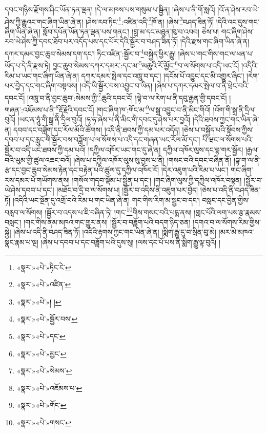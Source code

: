 དབང་གཉིས་རྫོགས་ཤིང་ཡོན་ཏན་ལྡན། །དེ་ལ་མཁས་པས་གསུམ་པ་སྦྱིན། །ཞེས་པ་ནི་གོ་སླའོ། །འོ་ན་ཤེས་རབ་ཡེ་ཤེས་ཀྱི་རྒྱུའང་གང་ཞིག་ཡིན་ཞེ་ན། །ཤེས་རབ་ཏིང་\footnote{«སྣར་»«པེ་»ཏིང་ངེ་}:འཛིན་འདི་\footnote{«སྣར་»«པེ་»འཛིན་}ཁོ་ན། །ཞེས་\footnote{«སྣར་»«པེ་»། །}བཤད་ཟིན་ཏོ། །དེའི་འང་དུས་གང་ཞིག་ཡིན་ཞེ་ན། སློབ་དཔོན་ཡོན་ཏན་ལྡན་པས་གནང་། །བླ་མ་དང་མཐུན་ཁུ་བ་འབབ། ཅེས་པ། གང་ཞིག་ཤེས་རབ་ཡེ་ཤེས་ཀྱི་དབང་ཐོབ་པར་འདོད་པས་དང་པོར་དེའི་སྦྱོར་བ་བཤད་ཟིན་ཏོ། །དེའི་རྫས་གང་ཞིག་ཡིན་ཞེ་ན། དཀར་དམར་བྱང་ཆུབ་སེམས་དག་དང་། ཏིང་འཛིན་:སྦྱོར་བ་\footnote{«སྣར་»«པེ་»སྦྱོར་བས་}བསྐྱེད་ཕྱིར་རྒྱུ། །ཞེས་པ་གང་གིས་གང་ལ་ཕན་པ་ཡོད་པ་དེ་ནི་རྫས་ཏེ། བྱང་ཆུབ་སེམས་དཀར་དམར་:དང་མ་\footnote{«སྣར་»«པེ་»དང་}མཆུའི་རོ་མྱོང་\footnote{«སྣར་»«པེ་»མྱང་}བ་ལ་སོགས་པ་འདི་ཡང་ངོ། །འདིའི་རིམ་པ་ཡང་གང་ཞིག་ཡིན་ཞེ་ན། དཀར་དམར་སྤེལ་དང་འཁྲུ་བ་དང་། །དངོས་པོ་འབྱུང་དང་མི་འགྱུར་ཞིང་། །རེག་པར་བྱེད་དང་གང་ཞིག་བསྟབས། །འདི་ཡི་སྦྱོར་བས་འབྱུང་བ་ཡིན། །ཞེས་པ་དཀར་དམར་སྤེལ་བ་ནི་ཕྲེང་བའི་དབང་ངོ། །འཁྲུ་བ་ནི་བྱང་ཆུབ་:སེམས་ཀྱི་\footnote{«སྣར་»«པེ་»སེམས་}ཆུའི་དབང་ངོ། །ལྟེ་བ་ལ་རེག་པ་ནི་དབུ་རྒྱན་གྱི་དབང་ངོ། །གཞན་:འཇོམས་པ་ནི་\footnote{«སྣར་»«པེ་»འཇོམས་པ་}རྡོ་རྗེའི་དབང་ངོ། །གང་ཞིག་ཁ་:གོང་མ་\footnote{«སྣར་»«པེ་»གོང་}ལ་སྒྲ་འབྱུང་བ་ནི་མིང་གིའོ། །འོག་གི་སྒྲ་ནི་དྲིལ་བུའོ། །ཡང་ན་ཧཱུཾ་གི་སྒྲ་ནི་དྲིལ་བུའོ། །ཧ་ཧ་ཞེས་པ་ནི་མིང་གི་དབང་དུ་ཤེས་པར་བྱའོ། །དེའི་ཐབས་ཀྱང་གང་ཡིན་ཞེ་ན། དབབ་དང་བཟློག་དང་རོལ་མོའི་ཚོགས། །འདི་ནི་ཐབས་ཀྱི་དམ་པར་འདོད། །ཅེས་པ་བསྐྱོད་པའི་སྟོབས་ཀྱིས་དབབ་པ་དང་རླུང་གི་སྦྱོར་བས་བཟློག་པ་ལ་སོགས་པ་འདི་དང་གཞན་ཡང་རོལ་མོ་དང་། པི་ཝང་ལ་སོགས་པའི་སྦྱོར་བ་འདི་ཡང་ཐབས་ཀྱི་དམ་པའོ། །དཀྱིལ་འཁོར་ཡང་གང་དུ་ཞེ་ན། དཀྱིལ་འཁོར་ལུས་དང་བྷ་གར་སྦྱོར། །རྒྱལ་བའི་ཡུམ་གྱི་ཚུལ་འཆང་བའོ། །ཞེས་པ་དཀྱིལ་འཁོར་ལུས་སུ་བྱས་པ་ནི། །གསང་བའི་དབང་བཞིན་ནོ། །བྷ་ག་ལ་ནི་རྩ་དང་བྱང་ཆུབ་སེམས་རྟེན་དང་བརྟེན་པའི་ཚུལ་དུ་དཀྱིལ་འཁོར་རོ། །དེར་འཇུག་པའི་རིམ་པ་ཡང་། གང་ཞིག་རས་དམར་པོ་གཡོགས་ནས། །གསོལ་གདབ་སྡོམ་པ་སྦྱིན་པ་དང་། །གང་ཞིག་ལུས་ཀྱི་དཀྱིལ་འཁོར་བསྟན། །སྦྱོར་བ་ཡེ་ཤེས་དབབ་པ་དང་། །མཐོང་བ་དྲི་བ་ལ་སོགས་པ། །སྦྱོར་བ་འདིས་ནི་འཇུག་པར་བྱེད། །ཅེས་པ་འདི་ནི་བཤད་ཟིན་ཏོ། །འདིའི་ཡང་སྔོན་དུ་འགྲོ་བའི་རིམ་པ་གང་ཡིན་ཞེ་ན། གང་གིས་རིག་མ་སྦྱང་བ་དང་། བསླང་དང་བྱིན་གྱིས་བརླབ་ལ་སོགས། །སྦྱོར་བ་འདས་པ་ཇི་བཞིན་ཏེ། །གང་\footnote{«སྣར་»«པེ་»གསང་}གིས་གསང་བའི་པདྨ་ནས། །གླང་པོའི་ལག་པས་རྩ་རྣམས་བསླང་། །གང་གིས་ནམ་མཁའ་གང་གྱུར་ནས། །སྦྱོར་བ་བཟློག་པའི་བདག་ཉིད་ཅན། །དགའ་བ་ལ་སོགས་རིམ་གྱིས་སྐྱེ། །ཞེས་པ་འདི་ནི་བཤད་ཟིན་ཏོ། །འདིའི་རྟགས་ཀྱང་གང་ཡིན་ཞེ་ན། །སྨིག་རྒྱུ་དུ་བ་སྲིན་བུ་མེ། །མར་མེ་མཁའ་སྣང་རྣམ་པ་ལྔ། །ཞེས་པ་དབབ་པ་དང་བཟློག་པའི་དུས་སུ། །ལས་དང་པོ་པས་ནི་སྨིག་རྒྱུ་ལྟ་བུའོ། །
